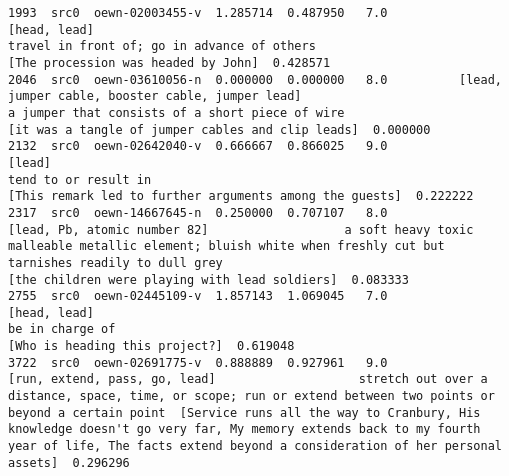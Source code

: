 \documentclass[a4paper,10pt,onecolumn,oneside,openright]{article}
\begin{document}
\begin{verbatim}
1993  src0  oewn-02003455-v  1.285714  0.487950   7.0                                              [head, lead]                                                                                       travel in front of; go in advance of others                                                                                                                                                          [The procession was headed by John]  0.428571
2046  src0  oewn-03610056-n  0.000000  0.000000   8.0          [lead, jumper cable, booster cable, jumper lead]                                                                                   a jumper that consists of a short piece of wire                                                                                                                                            [it was a tangle of jumper cables and clip leads]  0.000000
2132  src0  oewn-02642040-v  0.666667  0.866025   9.0                                                    [lead]                                                                                                              tend to or result in                                                                                                                                      [This remark led to further arguments among the guests]  0.222222
2317  src0  oewn-14667645-n  0.250000  0.707107   8.0                              [lead, Pb, atomic number 82]                   a soft heavy toxic malleable metallic element; bluish white when freshly cut but tarnishes readily to dull grey                                                                                                                                               [the children were playing with lead soldiers]  0.083333
2755  src0  oewn-02445109-v  1.857143  1.069045   7.0                                              [head, lead]                                                                                                                   be in charge of                                                                                                                                                               [Who is heading this project?]  0.619048
3722  src0  oewn-02691775-v  0.888889  0.927961   9.0                             [run, extend, pass, go, lead]                    stretch out over a distance, space, time, or scope; run or extend between two points or beyond a certain point  [Service runs all the way to Cranbury, His knowledge doesn't go very far, My memory extends back to my fourth year of life, The facts extend beyond a consideration of her personal assets]  0.296296

\end{verbatim}
\end{document}
